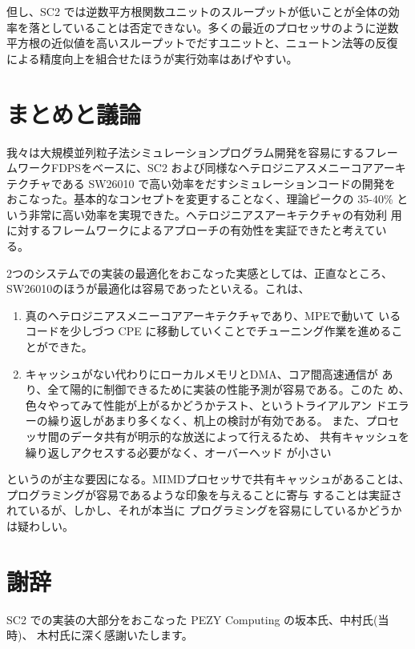 \documentclass[a4j]{jarticle}
\begin{document}
但し、SC2 では逆数平方根関数ユニットのスループットが低いことが全体の効
率を落としていることは否定できない。多くの最近のプロセッサのように逆数
平方根の近似値を高いスループットでだすユニットと、ニュートン法等の反復
による精度向上を組合せたほうが実行効率はあげやすい。


\section{まとめと議論}



我々は大規模並列粒子法シミュレーションプログラム開発を容易にするフレー
ムワークFDPSをベースに、SC2 および同様なヘテロジニアスメニーコアアーキ
テクチャである SW26010 で高い効率をだすシミュレーションコードの開発を
おこなった。基本的なコンセプトを変更することなく、理論ピークの 35-40\%
という非常に高い効率を実現できた。ヘテロジニアスアーキテクチャの有効利
用に対するフレームワークによるアプローチの有効性を実証できたと考えてい
る。

2つのシステムでの実装の最適化をおこなった実感としては、正直なところ、
SW26010のほうが最適化は容易であったといえる。これは、

\begin{enumerate}

  \item 真のヘテロジニアスメニーコアアーキテクチャであり、MPEで動いて
    いるコードを少しづつ CPE に移動していくことでチューニング作業を進めることができた。
    
  \item キャッシュがない代わりにローカルメモリとDMA、コア間高速通信が
    あり、全て陽的に制御できるために実装の性能予測が容易である。このた
    め、色々やってみて性能が上がるかどうかテスト、というトライアルアン
    ドエラーの繰り返しがあまり多くなく、机上の検討が有効である。
    また、プロセッサ間のデータ共有が明示的な放送によって行えるため、
    共有キャッシュを繰り返しアクセスする必要がなく、オーバーヘッド
    が小さい
   
\end{enumerate}

というのが主な要因になる。MIMDプロセッサで共有キャッシュがあることは、
プログラミングが容易であるような印象を与えることに寄与
することは実証されているが、しかし、それが本当に
プログラミングを容易にしているかどうかは疑わしい。


\section*{謝辞}

SC2 での実装の大部分をおこなった PEZY Computing の坂本氏、中村氏(当時)、
木村氏に深く感謝いたします。


 

\end{document}
